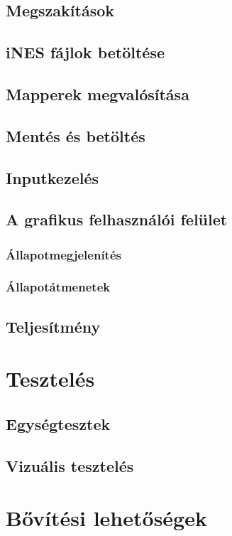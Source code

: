 \section{Megszakítások}

\section{iNES fájlok betöltése}

\section{Mapperek megvalósítása}

\section{Mentés és betöltés}

\section{Inputkezelés}

\section{A grafikus felhasználói felület}

\subsection{Állapotmegjelenítés}

\subsection{Állapotátmenetek}

\section{Teljesítmény}

\chapter{Tesztelés}

\section{Egységtesztek}

\section{Vizuális tesztelés}

\chapter{Bővítési lehetőségek}




